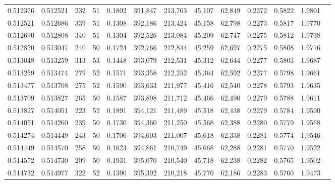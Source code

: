 \begin{tabular}{rrrrrrrrrrrrr}
0.512376 & 0.512521 &   232 &  51 &                                     0.1802 & 391,847 & 213,763 &  45,107 &  62,849 & 0.2272 & 0.5822 & 1.9801 \\
0.512521 & 0.512686 &   339 &  51 &                                     0.1308 & 392,186 & 213,424 &  45,158 &  62,798 & 0.2273 & 0.5817 & 1.9770 \\
0.512690 & 0.512808 &   340 &  51 &                                     0.1304 & 392,526 & 213,084 &  45,209 &  62,747 & 0.2275 & 0.5812 & 1.9738 \\
0.512820 & 0.513047 &   240 &  50 &                                     0.1724 & 392,766 & 212,844 &  45,259 &  62,697 & 0.2275 & 0.5808 & 1.9716 \\
0.513048 & 0.513259 &   313 &  53 &                                     0.1448 & 393,079 & 212,531 &  45,312 &  62,644 & 0.2277 & 0.5803 & 1.9687 \\
0.513259 & 0.513474 &   279 &  52 &                                     0.1571 & 393,358 & 212,252 &  45,364 &  62,592 & 0.2277 & 0.5798 & 1.9661 \\
0.513477 & 0.513708 &   275 &  52 &                                     0.1590 & 393,633 & 211,977 &  45,416 &  62,540 & 0.2278 & 0.5793 & 1.9635 \\
0.513709 & 0.513827 &   265 &  50 &                                     0.1587 & 393,898 & 211,712 &  45,466 &  62,490 & 0.2279 & 0.5788 & 1.9611 \\
0.513827 & 0.514051 &   223 &  52 &                                     0.1891 & 394,121 & 211,489 &  45,518 &  62,438 & 0.2279 & 0.5784 & 1.9590 \\
0.514051 & 0.514260 &   239 &  50 &                                     0.1730 & 394,360 & 211,250 &  45,568 &  62,388 & 0.2280 & 0.5779 & 1.9568 \\
0.514274 & 0.514449 &   243 &  50 &                                     0.1706 & 394,603 & 211,007 &  45,618 &  62,338 & 0.2281 & 0.5774 & 1.9546 \\
0.514449 & 0.514570 &   258 &  50 &                                     0.1623 & 394,861 & 210,749 &  45,668 &  62,288 & 0.2281 & 0.5770 & 1.9522 \\
0.514572 & 0.514730 &   209 &  50 &                                     0.1931 & 395,070 & 210,540 &  45,718 &  62,238 & 0.2282 & 0.5765 & 1.9502 \\
0.514732 & 0.514977 &   322 &  52 &                                     0.1390 & 395,392 & 210,218 &  45,770 &  62,186 & 0.2283 & 0.5760 & 1.9473 \\

\end{tabular}
